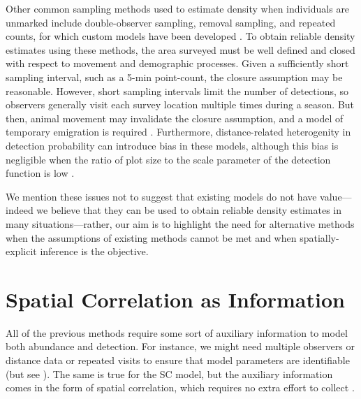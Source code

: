 Other common sampling methods used to estimate density when individuals are
unmarked include double-observer sampling, removal sampling, and
repeated counts, for which custom models have been developed
\citep{nichols_etal:2000, farnsworth_etal:2002, royle:2004biom,
  royle:2004abc, nichols_etal:2009,fiske_chandler:2011}. To
obtain reliable density estimates using these
methods, the area surveyed must be well defined and closed with
respect to movement and demographic processes. Given a sufficiently short
sampling interval, such as a 5-min point-count, the closure
assumption may be reasonable. However, short sampling intervals limit
the number of detections, so observers generally visit each survey
location multiple times during a season. But then, animal
movement may invalidate the closure assumption, and a model of
temporary emigration is required
\citep{kendall_etal:1997,chandler_etal:2011}. Furthermore,
distance-related heterogenity in detection probability can introduce
bias in these models, although this bias is negligible when the
ratio of plot size to the scale parameter of the detection function is low
\citep{efford_dawson:2009}.

We mention these issues not to suggest that existing models do not
have value---indeed we believe that they can be used to obtain
reliable density estimates in many situations---rather, our aim is to
highlight the need for alternative methods when the assumptions of
existing methods cannot be met and when spatially-explicit inference
is the objective. %


\section{Spatial Correlation as Information}
\label{sect.corr-info}

All of the previous methods require some sort of auxiliary information
to model both abundance and detection. For instance, we might
need multiple observers or distance data or repeated visits to ensure
that model parameters are identifiable (but see
  \citep{lele_etal:2012, solymos_etal:2012}). The same is true for
the SC model, but the auxiliary information comes in the form of spatial
correlation, which requires no extra effort to collect
\citep{chandler_royle:2012}. %

